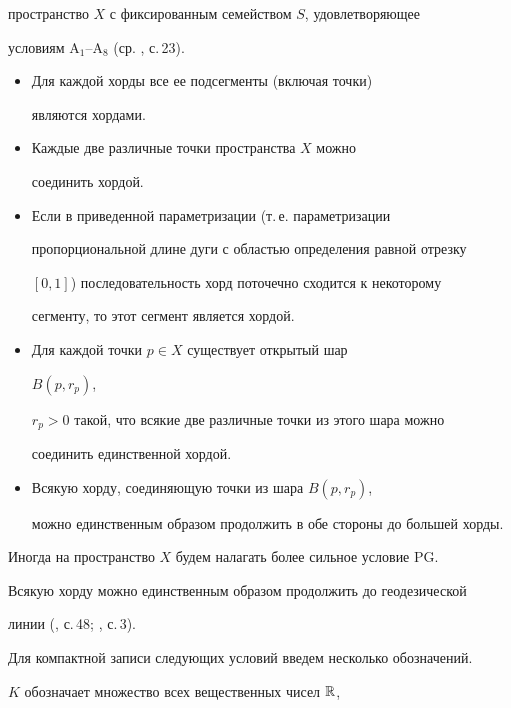 пространство $X$ с фиксированным семейством $S$, удовлетворяющее 


условиям A${}_1$--A${}_8$ (ср. \cite{1}, с.\,23). 


\begin{itemize} 


\item[A${}_1$.] Для каждой хорды все ее подсегменты (включая точки) 


являются хордами. 


\item[A${}_2$.] Каждые две различные точки пространства $X$ можно 


соединить хордой. 


\item[A${}_3$.] Если в приведенной параметризации (т.\,е. параметризации 


пропорциональной длине дуги с областью определения равной отрезку 


$[0,1]$) последовательность хорд поточечно сходится к некоторому 


сегменту, то этот сегмент является хордой. 


\item[A${}_4$.] Для каждой точки $p\in X$ существует открытый шар 


$B(p,r_p)$, 


$r_p>0$ такой, что всякие две различные точки из этого шара можно 


соединить единственной хордой. 


\item[A${}_5$.] Всякую хорду, соединяющую точки из шара $B(p,r_p)$, 


можно единственным образом продолжить в обе стороны до большей хорды. 


\end{itemize} 


 


Иногда на пространство $X$ будем налагать более сильное условие PG. 


Всякую хорду можно единственным образом продолжить до геодезической 


линии (\cite{2}, с.\,48; \cite{1}, с.\,3). 


 


Для компактной записи следующих условий введем несколько обозначений. 


$K$ обозначает множество всех вещественных чисел $\Bbb R$, 


